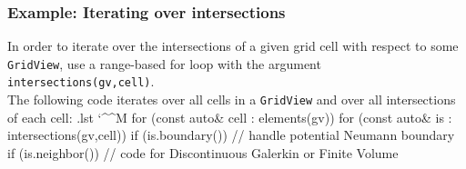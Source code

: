 \documentclass[ignorenonframetext,11pt]{beamer}
\makeatletter
\theoremstyle{definition}
\newenvironment{codeblock}{%
  \begin{tcolorbox}[size=small,oversize,boxrule=0pt,opacityframe=0,colback=blue!30!black!5!white]}{%
  \end{tcolorbox}}
\newenvironment{cppcode}{%
  \begingroup
  \@bsphack
  \immediate\openout\lstvrb@out\jobname.lst
  \let\do\@makeother\dospecials\catcode`\^^M\active
  \def\verbatim@processline{%
    \immediate\write\lstvrb@out{\the\verbatim@line}}%
  \verbatim@start}{%
  \immediate\closeout\lstvrb@out
  \@esphack
  \endgroup
  \begin{codeblock}
    \vspace*{-1ex}
    
    \vspace*{-1ex}
  \end{codeblock}}
\makeatother
\begin{document}
\begin{frame}[fragile]
\begin{columns}
\begin{column}{0.25\linewidth}
\begin{center}
      \end{center}
    \end{column}
  \end{columns}

\end{frame}



\begin{frame}[fragile] \frametitle{Example: Iterating over intersections}
In order to iterate over the intersections of a given grid cell with respect to some
\lstinline!GridView!, use a range-based for loop with the argument \lstinline!intersections(gv,cell)!.\\[.5em]
The following code iterates over all cells in a \lstinline!GridView! and over all intersections of each cell:
\begin{cppcode}
for (const auto& cell : elements(gv))
  for (const auto& is : intersections(gv,cell)) {
    if (is.boundary()) {
      // handle potential Neumann boundary
    }
    if (is.neighbor()) {
      // code for Discontinuous Galerkin or Finite Volume
    }
  }
\end{cppcode}
\end{frame}
\end{document}
